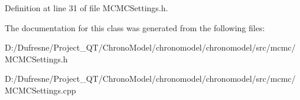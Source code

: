 Definition at line 31 of file M\-C\-M\-C\-Settings.\-h.



The documentation for this class was generated from the following files\-:\begin{DoxyCompactItemize}
\item 
D\-:/\-Dufresne/\-Project\-\_\-\-Q\-T/\-Chrono\-Model/chronomodel/chronomodel/src/mcmc/M\-C\-M\-C\-Settings.\-h\item 
D\-:/\-Dufresne/\-Project\-\_\-\-Q\-T/\-Chrono\-Model/chronomodel/chronomodel/src/mcmc/M\-C\-M\-C\-Settings.\-cpp\end{DoxyCompactItemize}
